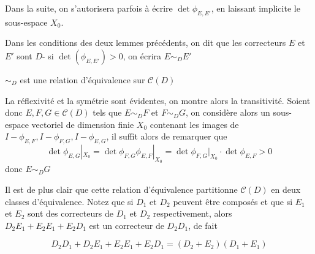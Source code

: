 \documentclass[memoire.tex]{subfiles}
\begin{document}
Dans la suite, on s'autorisera parfois à écrire $\det \phi_{E,E'}$, en laissant implicite le sous-espace $X_0$.



\begin{definition}
    Dans les conditions des deux lemmes précédents, 
    on dit que les correcteurs  $E$ et  $E'$  sont 
    $D$- si $\det (\phi_{E,E'})>0$, on écrira  $E\sim_{D} E'$
\end{definition}
\begin{proposition}
    $\sim_D$ est une relation d'équivalence sur $\mathcal{C}(D)$
\end{proposition}
\begin{preuve}
    La réflexivité et la symétrie sont évidentes, on montre alors la transitivité. Soient donc $E,F,G\in\mathcal{C}(D)$ tels que $E\sim_D F$ et $F\sim_D G$, on considère alors un sous-espace vectoriel de dimension finie $X_0$ contenant les images de $I-\phi_{E,F},I-\phi_{F,G},I-\phi_{E,G}$, il suffit alors de remarquer que 
    \begin{equation*}
        \det \phi_{E,G}|_{X_0}=
        \det \phi_{F,G}\phi_{E,F}|_
        {X_0}=
        \det \phi_{F,G}|_{X_0}
        \cdot \det \phi_{E,F}>0
    \end{equation*}
    donc $E\sim_{D} G$ 
\end{preuve}

Il est de plus clair que cette relation d'équivalence partitionne 
$\mathcal{C}(D)$ en deux classes d'équivalence. Notez que si $D_1$ et $D_2$ peuvent être composés et que si $E_1$ et $E_2$ sont des correcteurs de $D_1$ et $D_2$ respectivement, alors $D_2E_1+ E_2E_1+ E_2D_1$ est un correcteur de $D_2D_1$, de fait 

\begin{equation*}
    D_2D_1+ D_2E_1+ E_2E_1+ E_2D_1 =(D_2+E_2)(D_1 + E_1)
\end{equation*}
\end{document}
